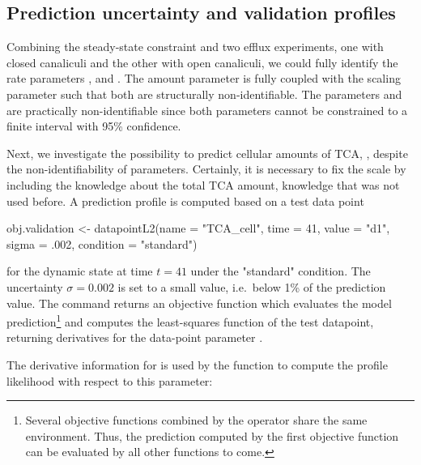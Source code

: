 \documentclass[article]{jss}
\begin{document}
\subsection{Prediction uncertainty and validation profiles}

Combining the steady-state constraint and two efflux experiments, one with closed canaliculi and the other with open canaliculi, we could fully identify the rate parameters ,  and . The amount parameter  is fully coupled with the scaling parameter  such that both are structurally non-identifiable. The parameters  and  are practically non-identifiable since both parameters cannot be constrained to a finite interval with 95\% confidence.

Next, we investigate the possibility to predict cellular amounts of TCA, , despite the non-identifiability of parameters. Certainly, it is necessary to fix the scale by including the knowledge about the total TCA amount, knowledge that was not used before. A prediction profile is computed based on a test data point

\begin{CodeChunk}
\begin{CodeInput}
obj.validation <- datapointL2(name = "TCA_cell", 
			      time = 41, 
			      value = "d1", 
			      sigma = .002, 
			      condition = "standard")
\end{CodeInput}
\end{CodeChunk}

for the dynamic state  at time $t = 41$ under the "standard" condition. The uncertainty $\sigma = 0.002$ is set to a small value, i.e.~below 1\% of the prediction value. The  command returns an objective function which evaluates the model prediction\footnote{Several objective functions combined by the  operator share the same environment. Thus, the prediction computed by the first objective function can be evaluated by all other functions to come.} and computes the least-squares function of the test datapoint, returning derivatives for the data-point parameter .

The derivative information for  is used by the  function to compute the profile likelihood with respect to this parameter:

\begin{CodeChunk}
\end{CodeChunk}
\end{document}
